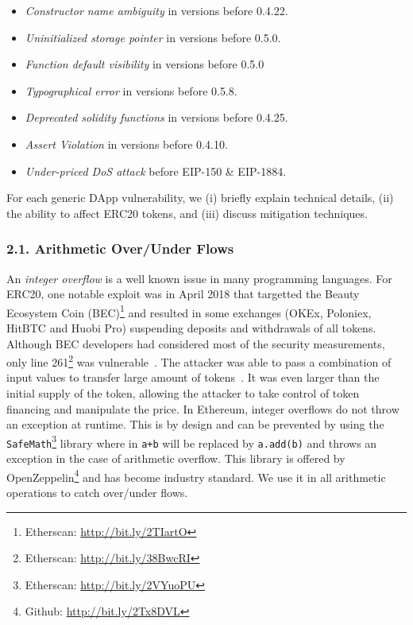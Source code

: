\begin{itemize}
	\item \textit{Constructor name ambiguity} in versions before 0.4.22.
	\item \textit{Uninitialized storage pointer} in versions before 0.5.0.
	\item \textit{Function default visibility} in versions before 0.5.0
	\item \textit{Typographical error} in versions before 0.5.8.
	\item \textit{Deprecated solidity functions} in versions before 0.4.25.
	\item \textit{Assert Violation} in versions before 0.4.10.
	\item \textit{Under-priced DoS attack} before EIP-150 \& EIP-1884.
\end{itemize}

For each generic DApp vulnerability, we (i) briefly explain technical details, (ii) the ability to affect ERC20 tokens, and (iii) discuss mitigation techniques.

\subsubsection*{2.1. Arithmetic Over/Under Flows}
An \textit{integer overflow} is a well known issue in many programming languages. For ERC20, one notable exploit was in April 2018 that targetted the Beauty Ecosystem Coin (BEC)\footnote{Etherscan: \url{http://bit.ly/2TIartO}} and resulted in some exchanges (\eg OKEx, Poloniex, HitBTC and Huobi Pro) suspending deposits and withdrawals of all tokens. Although BEC developers had considered most of the security measurements, only line 261\footnote{Etherscan: \url{http://bit.ly/38BwcRI}} was vulnerable~\cite{PeckShield}. The attacker was able to pass a combination of input values to transfer large amount of tokens~\cite{Overflow}. It was even larger than the initial supply of the token, allowing the attacker to take control of token financing and manipulate the price. In Ethereum, integer overflows do not throw an exception at runtime. This is by design and can be prevented by using the \texttt{SafeMath}\footnote{Etherscan: \url{http://bit.ly/2VYuoPU}} library where in \texttt{a+b} will be replaced by \texttt{a.add(b)} and throws an exception in the case of arithmetic overflow. This library is offered by OpenZeppelin\footnote{Github: \url{http://bit.ly/2Tx8DVL}} and has become industry standard. We use it in all arithmetic operations to catch over/under flows.

